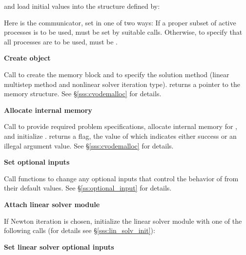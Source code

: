 \begin{Steps}
  and load initial values into the structure defined by:

  {\s} 

  {\p} 

  Here  is the {\mpi} communicator, set in one of two ways: 
  If a proper subset of active processes is to be used,  
  must be set by suitable {\mpi} calls. Otherwise, to specify that all 
  processes are to be used,  must be .
  
\item\label{i:cvode_create} 
  {\bf Create {\cvodes} object}

  Call  
  to create the {\cvodes} memory block and to specify the solution method
  (linear multistep method and nonlinear solver iteration type).
   returns a pointer to the {\cvodes} memory structure.
  See \S\ref{sss:cvodemalloc} for details.

\item\label{i:cvode_malloc} 
  {\bf Allocate internal memory}

  Call  
  to provide required problem specifications,
  allocate internal memory for {\cvodes}, 
  and initialize {\cvodes}.
   returns a flag, the value of which indicates either success or an illegal
  argument value.  See \S\ref{sss:cvodemalloc} for details.
  
\item
  {\bf Set optional inputs}

  Call  functions to change any
  optional inputs that control the behavior of {\cvodes} from their default values.
  See \S\ref{ss:optional_input} for details.

\item\label{i:lin_solver} 
  {\bf Attach linear solver module}

  If Newton iteration is chosen, initialize the linear solver module
  with one of the following calls (for details see \S\ref{sss:lin_solv_init}):

  {\s} 

  {\s} 


  
\item
  {\bf Set linear solver optional inputs}


\end{Steps}
